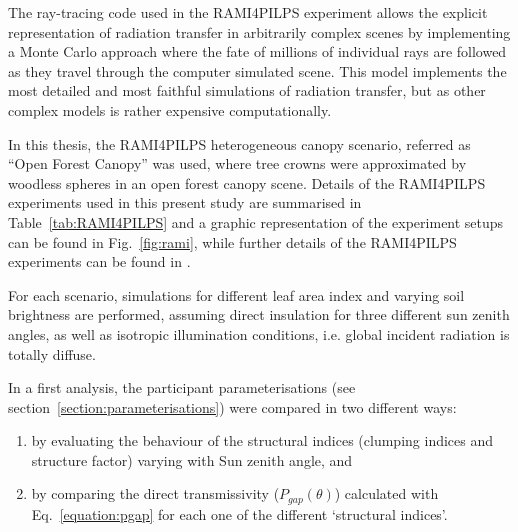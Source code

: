 \documentclass[a4paper,11pt]{report}
\begin{document}
The ray-tracing code used in the RAMI4PILPS experiment allows the explicit representation of radiation transfer in arbitrarily complex scenes \citep{Govaerts1998} by implementing a Monte Carlo approach where the fate of millions of individual rays are followed as they travel through the computer simulated scene. This model implements the most detailed and most faithful simulations of radiation transfer, but as other complex models is rather expensive computationally. 

In this thesis, the RAMI4PILPS heterogeneous canopy scenario, referred as ``Open Forest Canopy'' was used, where tree crowns were approximated by woodless spheres in an open forest canopy scene. Details of the RAMI4PILPS experiments used in this present study are summarised in Table~\ref{tab:RAMI4PILPS} and a graphic representation of the experiment setups can be found in Fig.~\ref{fig:rami}, while further details of the RAMI4PILPS experiments can be found in \citet{Widlowski2011}. 

For each scenario, simulations for different leaf area index and varying soil brightness are performed, assuming direct insulation for three different sun zenith angles, as well as isotropic illumination conditions, i.e. global incident radiation is totally diffuse.

In a first analysis, the participant parameterisations (see section~\ref{section:parameterisations}) were compared in two different ways:
\begin{enumerate}[i]
\item by evaluating the behaviour of the structural indices (clumping indices and structure factor) varying with Sun zenith angle, and
\item by comparing the direct transmissivity ($P_{gap}(\theta)$) calculated with Eq.~\ref{equation:pgap} for each one of the different `structural indices'.
\end{enumerate}
\end{document}
